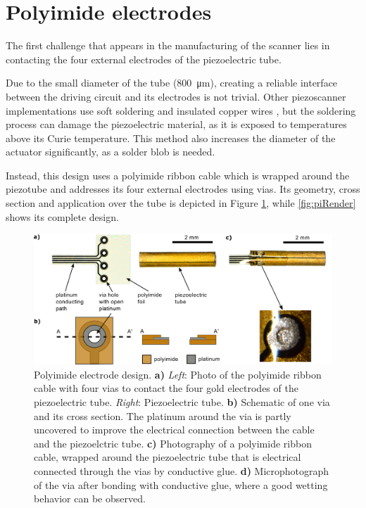 \section{Polyimide electrodes}
The first challenge that appears in the manufacturing of the scanner lies in contacting the four external electrodes of the piezoelectric tube. 

Due to the small diameter of the tube (\SI{800}{\micro\meter}), creating a reliable interface between the driving circuit and its electrodes is not trivial. Other piezoscanner implementations use soft soldering and insulated copper wires \cite{Lee2010, Meinert, Huo2010}, but the soldering process can damage the piezoelectric material, as it is exposed to temperatures above its Curie temperature. This method also increases the diameter of the actuator significantly, as a solder blob is needed. %

Instead, this design uses a polyimide ribbon cable which is wrapped around the piezotube and addresses its four external electrodes using vias. Its geometry, cross section and application over the tube is depicted in Figure \ref{fig:piRolled}, while \autoref{fig:piRender} shows its complete design.

\begin{figure}[h!]\centering \includegraphics[width=15cm]{figures/40_Fabrication/PI/tubeFoilH.png}
      \caption{Polyimide electrode design.
      \textbf{a)} \textit{Left}: Photo of the polyimide ribbon cable with four vias to contact the four gold electrodes of the piezoelectric tube. \textit{Right}: Piezoelectric tube.
      \textbf{b)} Schematic of one via and its cross section. The platinum around the via is partly uncovered to improve the electrical connection between the cable and the piezoelctric tube.
      \textbf{c)} Photography of a polyimide ribbon cable, wrapped around the piezoelectric tube that is electrical connected through the vias by conductive glue.
      \textbf{d)} Microphotograph of the via after bonding with conductive glue, where a good wetting behavior can be observed.}
      \label{fig:piRolled}
\end{figure}

